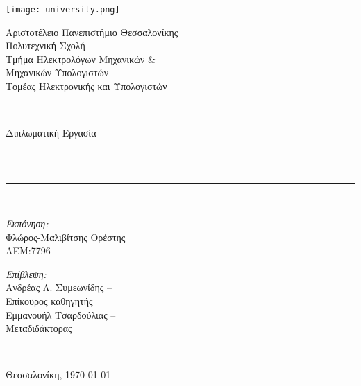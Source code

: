 \begin{titlepage}
    \centering\begin{minipage}{0.3\textwidth}
        \centering\texttt{[image: university.png]}
    \end{minipage}%
    \begin{minipage}{0.7\textwidth}
        \begin{flushleft}
            \large Αριστοτέλειο Πανεπιστήμιο Θεσσαλονίκης\\
            Πολυτεχνική Σχολή\\
            Τμήμα Ηλεκτρολόγων Μηχανικών \&\\Μηχανικών Υπολογιστών\\
            Τομέας Ηλεκτρονικής και Υπολογιστών\\[5cm]
        \end{flushleft}
    \end{minipage} \\[1.7cm]

    \begin{center}
        \Large Διπλωματική Εργασία \\[0.8cm]

        \rule{450pt}{4pt} \\[0.4cm]
        \makeatletter{\fontsize{20.26pt}{1em}\selectfont{}\@title{}}\makeatother

        \rule{350pt}{4pt} \\[4cm]

        \noindent\begin{minipage}{0.4\textwidth}
            \begin{flushleft} \large
                \emph{Εκπόνηση:} \\
                Φλώρος-Μαλιβίτσης Ορέστης\\ΑΕΜ:7796\\
            \end{flushleft}
        \end{minipage}%
        \begin{minipage}{0.5\textwidth}
            \begin{flushright} \large
                \emph{Επίβλεψη:} \\
                Ανδρέας Λ. Συμεωνίδης --\\ Επίκουρος καθηγητής\\
                Εμμανουήλ Τσαρδούλιας --\\ Μεταδιδάκτορας
            \end{flushright}
        \end{minipage}
        \\[1cm]
        \vfill

        \large Θεσσαλονίκη, \today{} %
    \end{center}
\end{titlepage}

